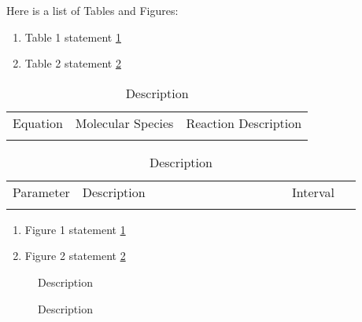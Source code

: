 \documentclass[preprint, 12pt]{elsarticle}
\theoremstyle{definition}
\begin{document}
	
Here is a list of Tables and Figures:
\vspace{8pt}	
\begin{enumerate} \itemsep -2pt
	\item Table 1 statement \ref{Table1} \\
	\item Table 2 statement \ref{Table2} \\
\end{enumerate}
\vspace{8pt}

\begin{table}[H]
	\centering
	\begin{tabular}{rll}
		\hline
		Equation & Molecular Species & Reaction Description\\ 
		\\
		\hline
	\end{tabular}
	\caption{Description}
	\label{Table1}
\end{table}
\vspace{8pt}
\begin{table}[H]
	\centering
	\begin{tabular}{p{0.2\linewidth}p{0.6\linewidth}p{0.2\linewidth}}
		\hline
			Parameter & Description & Interval\\
		\\
		\hline
	\end{tabular}
	\caption{Description}
	\label{Table2}
\end{table}

\vspace{8pt}
\begin{enumerate} \itemsep -2pt	
	\item Figure 1 statement \ref{Figure1}  \\
	\item Figure 2 statement \ref{Figure2}\\
\end{enumerate}

\vspace{6pt}
\begin{figure}[H]
	\centering
	\begin{minipage}[b]{1\linewidth}
	\end{minipage}\hfill
	\caption{Description}
	\label{Figure1}
\end{figure}
\vspace{6pt}	

\begin{figure}[H]
	\centering
	\begin{minipage}[b]{1\linewidth}
	\end{minipage}\hfill
	\caption{Description}
	\label{Figure2}
\end{figure}
\vspace{6pt}	
\end{document}
